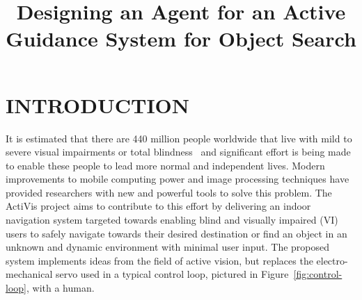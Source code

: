 \documentclass[a4paper, twoside]{article}
\begin{document}
\title{Designing an Agent for an Active Guidance System for Object Search} 

\author{
}



\onecolumn \maketitle \normalsize \vfill

\section{\uppercase{Introduction}}

\noindent It is estimated that there are 440 million people worldwide that live with mild to severe visual impairments or total blindness~\cite{bourne2017magnitude} and significant effort is being made to enable these people to lead more normal and independent lives. Modern improvements to mobile computing power and image processing techniques have provided researchers with new and powerful tools to solve this problem. The ActiVis project aims to contribute to this effort by delivering an indoor navigation system targeted towards enabling blind and visually impaired (VI) users to safely navigate towards their desired destination or find an object in an unknown and dynamic environment with minimal user input. The proposed system implements ideas from the field of active vision, but replaces the electro-mechanical servo used in a typical control loop, pictured in Figure~\ref{fig:control-loop}, with a human. %
\end{document}
